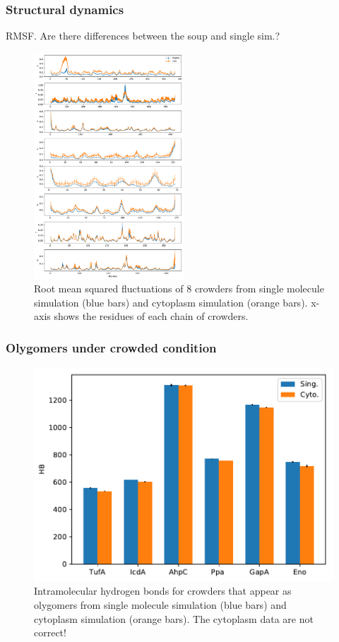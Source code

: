 \documentclass[journal=jacsat,manuscript=article]{achemso}
\begin{document}
\subsubsection{Structural dynamics}
RMSF. Are there differences between the soup and single sim.?

\begin{figure}
\includegraphics[width=0.5\textwidth]{rmsf.pdf}
\caption{Root mean squared fluctuations of 8 crowders from single molecule simulation (blue bars) and cytoplasm simulation (orange bars). x-axis shows the residues of each chain of crowders.}
\end{figure}


\subsubsection{Olygomers under crowded condition}
\begin{figure}
\includegraphics[scale=0.6]{hb.pdf}
\caption{Intramolecular hydrogen bonds for crowders that appear as olygomers from single molecule simulation (blue bars) and cytoplasm simulation (orange bars). The cytoplasm data are not correct!}
\end{figure}
\end{document}
